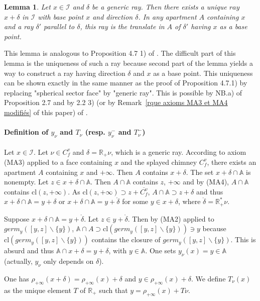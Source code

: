 \documentclass[12pt]{article}
\theoremstyle{plain}
\newtheorem{lemme}[thm]{Lemma}
\theoremstyle{definition}
\newcommand{\R}{\mathbb{R}}
\newcommand{\A}{\mathbb{A}}
\newcommand{\I}{\mathcal{I}}
\begin{document}
\begin{lemme}\label{lemme demi-droite de base donnée}
Let $x\in \I$ and $\delta$ be a generic ray. Then there exists a unique $ray$ $x+\delta$ in $\I$ with base point $x$ and direction $\delta$. In any apartment $A$ containing $x$ and a ray $\delta'$ parallel to $\delta$, this ray is the translate in $A$ of $\delta'$ having $x$ as a base point.
\end{lemme}

This lemma is analogous to Proposition 4.7 1) of \cite{rousseau2011masures}. The difficult part of this lemma is the uniqueness of such a ray because second part of the lemma yields a way to construct a ray having direction $\delta$ and $x$ as a base point. This uniqueness can be shown exactly in the same manner as the proof of Proposition 4.7.1) by replacing "spherical sector face" by "generic ray". This is possible by NB.a) of Proposition 2.7 and by 2.2 3) (or by Remark~\ref{rque axioms MA3 et MA4 modifiés} of this paper) of \cite{rousseau2011masures}.


\paragraph{Definition of $y_\nu$ and $T_\nu$ (resp. $y^-_\nu$ and $T^-_\nu$)}
Let $x\in \mathcal{I}$. Let $\nu \in C_f^v$ and $\delta=\R_+\nu$, which is a generic ray. According to axiom (MA3) applied to a face containing $x$ and the splayed chimney $C^v_f$, there exists an apartment $A$ containing $x$ and $+\infty$. Then $A$ contains $x+\delta$. The set $x+\delta\cap \A$ is nonempty. Let $z\in x+\delta\cap \A$. Then $A\cap \A$ contains $z$, $+\infty$ and by (MA4), $A\cap\A$ contains $\mathrm{cl}(z,+\infty)$. As $\mathrm{cl}(z,+\infty)\supset z+\overline{C_f^v}$,  $A\cap\A \supset z+\delta$ and thus $x+\delta\cap \A=y+\delta$ or $x+\delta\cap \A=y+\mathring{\delta}$ for some $y\in x+\delta$, where $\mathring \delta=\R^*_+\nu$.

 Suppose $x+\delta\cap \A=y+\mathring{\delta}$. Let $z\in y+\mathring{\delta}$. Then by (MA2) applied to $germ_y([y,z]\backslash\{y\})$, $\A\cap A\supset \mathrm{cl}(germ_y([y,z]\backslash\{y\}))\ni y$ because $\mathrm{cl}(germ_y([y,z]\backslash\{y\}))$ contains the closure of $germ_y([y,z]\backslash\{y\})$. This is absurd and thus $\A\cap x+\delta=y+\delta$, with $y\in \A$. One sets $y_\nu(x)=y\in\A$ (actually, $y_\nu$ only depends on $\delta$).

One has $\rho_{+\infty}(x+\delta)=\rho_{+\infty}(x)+\delta$ and $y\in \rho_{+\infty}(x)+\delta$. We define $T_\nu(x)$ as the unique element $T$ of $\mathbb{R}_+$ such that $y=\rho_{+\infty}(x)+T\nu$.
\end{document}
